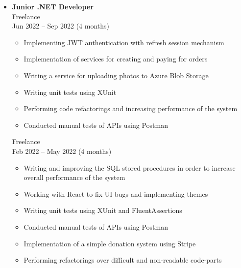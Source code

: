 \begin{itemize}[noitemsep]
    \item \textbf{Junior .NET Developer} \\
    Freelance \\
    Jun 2022 -- Sep 2022 \; (4 months)
    \begin{itemize}[noitemsep]
        \item Implementing JWT authentication with refresh session mechanism
        \item Implementation of services for creating and paying for orders
        \item Writing a service for uploading photos to Azure Blob Storage
        \item Writing unit tests using XUnit
        \item Performing code refactorings and increasing performance of the system
        \item Conducted manual tests of APIs using Postman
    \end{itemize}

    Freelance \\
    Feb 2022 -- May 2022 \; (4 months)
    \begin{itemize}[noitemsep]
        \item Writing and improving the SQL stored procedures in order to increase overall performance of the system
        \item Working with React to fix UI bugs and implementing themes
        \item Writing unit tests using XUnit and FluentAssertions
        \item Conducted manual tests of APIs using Postman
        \item Implementation of a simple donation system using Stripe
        \item Performing refactorings over difficult and non-readable code-parts
    \end{itemize}
\end{itemize}
